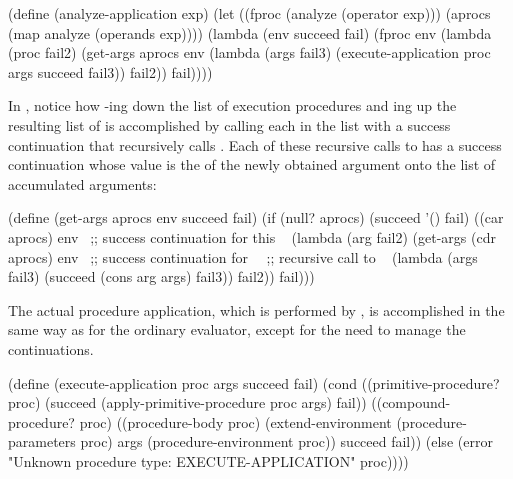 \begin{codeBlock}
(define (analyze-application exp)
  (let ((fproc (analyze (operator exp)))
        (aprocs (map analyze (operands exp))))
    (lambda (env succeed fail)
      (fproc env
             (lambda (proc fail2)
               (get-args aprocs
                         env
                         (lambda (args fail3)
                           (execute-application
                            proc args succeed fail3))
                         fail2))
             fail))))
\end{codeBlock}

\noindent
In , notice how -ing down the list of 
execution procedures and ing up the resulting list of  is
accomplished by calling each  in the list with a success
continuation that recursively calls .  Each of these recursive
calls to  has a success continuation whose value is the
 of the newly obtained argument onto the list of accumulated
arguments:

\begin{codeBlock}
(define (get-args aprocs env succeed fail)
  (if (null? aprocs)
      (succeed '() fail)
      ((car aprocs)
       env
       ~\textrm{;; success continuation for this }~
       (lambda (arg fail2)
         (get-args
          (cdr aprocs)
          env
          ~\textrm{;; success continuation for}~
          ~\textrm{;; recursive call to }~
          (lambda (args fail3)
            (succeed (cons arg args) fail3))
          fail2))
       fail)))
\end{codeBlock}

\noindent
The actual procedure application, which is performed by
, is accomplished in the same way as for the ordinary
evaluator, except for the need to manage the continuations.

\begin{codeBlock}
(define (execute-application proc args succeed fail)
  (cond ((primitive-procedure? proc)
         (succeed (apply-primitive-procedure proc args)
                  fail))
        ((compound-procedure? proc)
         ((procedure-body proc)
          (extend-environment
           (procedure-parameters proc)
           args
           (procedure-environment proc))
          succeed
          fail))
        (else
         (error "Unknown procedure type: EXECUTE-APPLICATION"
                proc))))
\end{codeBlock}


